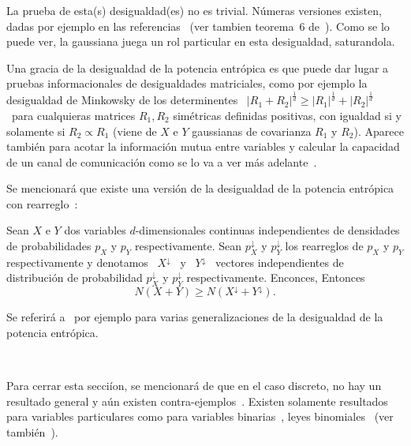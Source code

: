 %

La  prueba  de  esta(s)  desigualdad(es)  no es  trivial.   N\'umeras  versiones
existen,  dadas por  ejemplo  en las  referencias~\cite{Bla65, Sta59,  ShaWea64,
  Rio07,  Rio11,  Rio17,  CovTho06,  DemCov91,  Lie78,  VerGuo06}  (ver  tambien
teorema~6 de~\cite{Lie75}).   Como se  lo puede ver,  la gaussiana juega  un rol
particular en esta desigualdad, saturandola.

Una gracia de la desigualdad de la potencia entr\'opica es que puede dar lugar a
pruebas  informacionales  de  desigualdades  matriciales, como  por  ejemplo  la
desigualdad  de Minkowsky  de los  determinentes  \ $|R_1  + R_2|^{\frac1d}  \ge
|R_1|^{\frac1d}  +  |R_2|^{\frac1d}$  \  para cualquieras  matrices  $R_1,  R_2$
sim\'etricas definidas  positivas, con igualdad  si y solamente si  $R_2 \propto
R_1$  (viene de  $X$ e  $Y$ gaussianas  de covarianza  $R_1$ y  $R_2$).  Aparece
tambi\'en  para acotar  la informaci\'on  mutua  entre variables  y calcular  la
capacidad  de   un  canal  de  comunicaci\'on   como  se  lo  va   a  ver  m\'as
adelante~\cite{CovTho06, DemCov91, Rio07, Joh04}.

Se  mencionar\'a que  existe  una versi\'on  de  la desigualdad  de la  potencia
entr\'opica con rearreglo~\cite{WanMad04}:
%
\begin{teorema}
  Sean  $X$ e $Y$  dos variables  $d$-dimensionales continuas  independientes de
  densidades   de   probabilidades   $p_X$   y   $p_Y$   respectivamente.   Sean
  $p^\downarrow_X$  y   $p^\downarrow_Y$  los   rearreglos  de  $p_X$   y  $p_Y$
  respectivamente y denotamos  \ $X^\downarrow$ \ y \  $Y^\downarrow$ \ vectores
  independientes   de   distribuci\'on   de  probabilidad   $p^\downarrow_X$   y
  $p^\downarrow_Y$ respectivamente. Enconces, Entonces
  \[
  N(X + Y) \ge N(X^\downarrow + Y^\downarrow).
  \]
\end{teorema}

Se referir\'a a~\cite[y Ref.]{MadBar07} por ejemplo para varias generalizaciones
de la desigualdad de la potencia entr\'opica.

\

Para cerrar esta secci\'ion, se mencionar\'a  de que en el caso discreto, no hay
un  resultado general  y a\'un  existen contra-ejemplos~\cite[Sec.~IV]{JohYu10}.
Existen  solamente resultados  para variables  particulares como  para variables
binarias~\cite{ShaWyn90},   leyes   binomiales~\cite{HarVig03,  ShaDas11}   (ver
tambi\'en~\cite{JohYu10, HagAbb14}).


